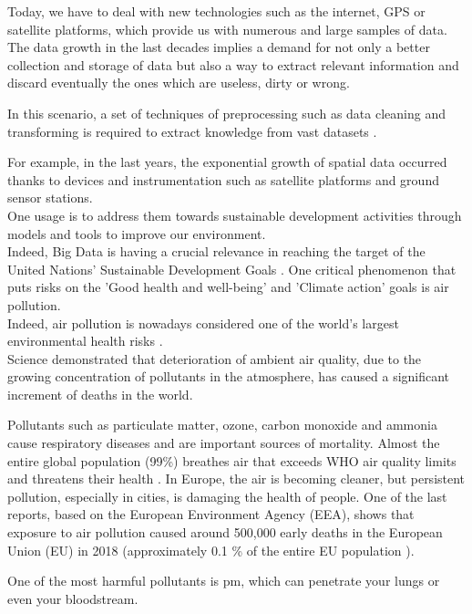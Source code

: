 Today, we have to deal with new technologies such as the internet, GPS or satellite platforms, which provide us with numerous and large samples of data.\\ 
The data growth in the last decades implies a demand for not only a better collection and storage of data but also a way to extract relevant information and discard eventually the ones which are useless, dirty or wrong.\par
In this scenario, a set of techniques of preprocessing such as data cleaning and transforming is required to extract knowledge from vast datasets \cite{garcia2016big}.
\par
For example, in the last years, the exponential growth of spatial data occurred thanks to devices and instrumentation such as satellite platforms and ground sensor stations. \\
One usage is to address them towards sustainable development activities through models and tools to improve our environment. \\
Indeed, Big Data is having a crucial relevance in reaching the target of the United Nations’ Sustainable Development Goals  \cite{zhang2019orchestrating}.
One critical phenomenon that puts risks on the 'Good health and well-being' and 'Climate action' goals is air pollution.\\
Indeed, air pollution is nowadays considered one of the world's largest environmental health risks \cite{fuller2022pollution}.\\
Science demonstrated that deterioration of ambient air quality, due to the growing concentration of pollutants in the atmosphere, has caused a significant increment of deaths in the world.\par  
Pollutants such as particulate matter, ozone, carbon monoxide and ammonia cause respiratory diseases and are important sources of mortality.
Almost the entire global population (99\%) breathes air that exceeds WHO air quality limits and threatens their health \cite{WHOreport}.\newline
In Europe, the air is becoming cleaner, but persistent pollution, especially in cities, is damaging the health of people. One of the last reports, based on the European Environment Agency (EEA), shows that exposure to air pollution caused around 500,000 early deaths in the European Union (EU) in 2018  \cite{european2018air} (approximately 0.1 \% of the entire EU population \cite{populationeu} ).\par
One of the most harmful pollutants is \gls{pm}, which can penetrate your lungs or even your bloodstream.\newline 
